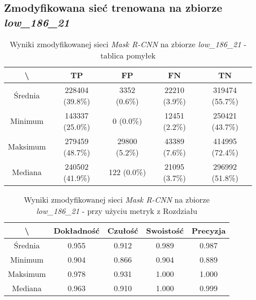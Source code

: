 \subsection{Zmodyfikowana sieć trenowana na zbiorze \textit{low\_186\_21}}

\begin{table}[H]
	\centering
	\caption{Wyniki zmodyfikowanej sieci \textit{Mask R-CNN} na zbiorze \textit{low\_186\_21} - tablica pomyłek}
	\vspace{6pt}
	{\footnotesize
		\begin{tabular}{|c|c|c|c|c|}
      \hline \textbackslash & TP & FP & FN & TN \\
      \hline Średnia & 228404 (39.8\%) & 3352 (0.6\%) & 22210 (3.9\%) & 319474 (55.7\%) \\
      \hline Minimum & 143337 (25.0\%) & 0 (0.0\%) & 12451 (2.2\%) & 250421 (43.7\%) \\
      \hline Maksimum & 279459 (48.7\%) & 29800 (5.2\%) & 43389 (7.6\%) & 414995 (72.4\%) \\
      \hline Mediana & 240502 (41.9\%) & 122 (0.0\%) & 21095 (3.7\%) & 296992 (51.8\%) \\
      \hline
		\end{tabular}
	}
  \vspace{0pt}
  \label{Tab:low_modified}
\end{table}


\begin{table}[H]
	\centering
	\caption{Wyniki zmodyfikowanej sieci \textit{Mask R-CNN} na zbiorze \textit{low\_186\_21} - przy użyciu metryk z Rozdziału }
	\vspace{6pt}
	{\footnotesize
		\begin{tabular}{|c|c|c|c|c|}
      \hline \textbackslash & Dokładność & Czułość & Swoistość & Precyzja \\
      \hline Średnia & 0.955 & 0.912 & 0.989 & 0.987 \\
      \hline Minimum & 0.904 & 0.866 & 0.904 & 0.889 \\
      \hline Maksimum & 0.978 & 0.931 & 1.000 & 1.000 \\
      \hline Mediana & 0.963 & 0.910 & 1.000 & 0.999 \\
      \hline
		\end{tabular}
	}
  \vspace{0pt}
  \label{Tab:low_modified_calculated}
\end{table}

